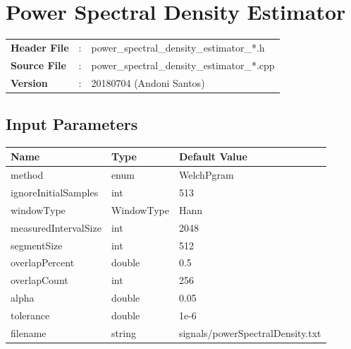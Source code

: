 \clearpage

\section{Power Spectral Density Estimator}

\begin{refsection}

\begin{tcolorbox}	
	\begin{tabular}{p{2.75cm} p{0.2cm} p{10.5cm}} 	
		\textbf{Header File}   &:& power\_spectral\_density\_estimator\_*.h \\
		\textbf{Source File}   &:& power\_spectral\_density\_estimator\_*.cpp \\
		\textbf{Version}	   &:& 20180704 (Andoni Santos)
	\end{tabular}
\end{tcolorbox}

\subsection*{Input Parameters}

\begin{table}[H]
	\centering
	\begin{tabular}{|l|l|l|}
		\hline
		\textbf{Name}  		 & \textbf{Type}  & \textbf{Default Value}    	\\\hline
		method				& enum				& WelchPgram			\\\hline
		ignoreInitialSamples & int				& 513					\\\hline
		windowType			 & WindowType     & Hann			  	\\\hline
		measuredIntervalSize & int 			  & 2048				\\\hline
		segmentSize			 & int			  & 512					\\\hline
		overlapPercent 		 & double 		& 0.5					\\\hline
		overlapCount		& int			& 256					\\\hline
		alpha				& double		& 0.05					\\\hline
		tolerance			& double		& 1e-6					\\\hline
		filename			& string			& signals/powerSpectralDensity.txt	\\\hline
	\end{tabular}
\end{table}



\end{refsection}
